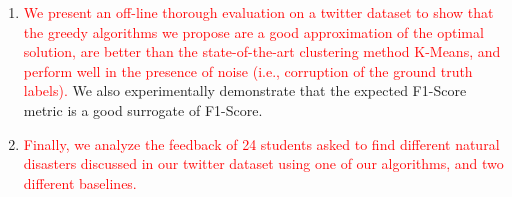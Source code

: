 \begin{enumerate}
\item \textcolor{red}{We present an off-line thorough evaluation on a twitter dataset to show that the greedy algorithms we propose are a good approximation of the optimal solution, are better than the state-of-the-art clustering method K-Means, and perform well in the presence of noise (i.e., corruption of the ground truth labels).}
We also experimentally demonstrate that the expected F1-Score metric is a good surrogate of F1-Score.
\item \textcolor{red}{Finally, we analyze the feedback of 24 students asked to find different natural disasters discussed in our twitter dataset using one of our algorithms, and two different baselines.}
\end{enumerate}




